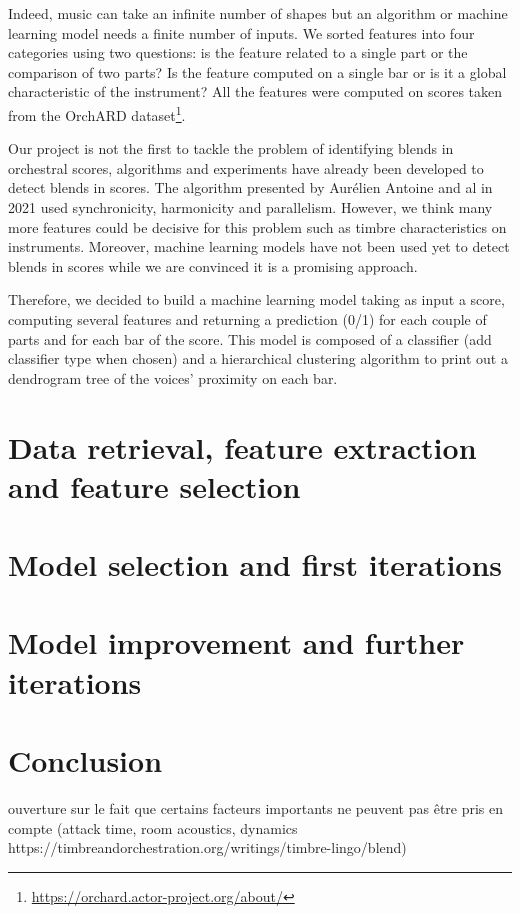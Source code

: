 \documentclass[11pt, a4paper]{article}
\begin{document}
Indeed, music can take an infinite number of shapes but an algorithm or machine learning model needs a finite number of inputs\cite{}.
We sorted features into four categories using two questions: is the feature related to a single part or the comparison of two parts?
Is the feature computed on a single bar or is it a global characteristic of the instrument?
All the features were computed on scores taken from the OrchARD dataset\footnote[1]{\url{https://orchard.actor-project.org/about/}}.


Our project is not the first to tackle the problem of identifying blends in orchestral scores, algorithms and experiments have already been developed to detect blends in scores.
The algorithm presented by Aurélien Antoine and al in 2021 used synchronicity, harmonicity and parallelism\cite{}.
However, we think many more features could be decisive for this problem such as timbre characteristics on instruments\cite{}.
Moreover, machine learning models have not been used yet to detect blends in scores while we are convinced it is a promising approach.

Therefore, we decided to build a machine learning model taking as input a score, computing several features and returning a prediction (0/1) for each couple of parts and for each bar of the score.
This model is composed of a classifier (add classifier type when chosen) and a hierarchical clustering algorithm to print out a dendrogram tree of the voices' proximity on each bar.

\newpage

\tableofcontents

\newpage

\section{Data retrieval, feature extraction and feature selection}

\section{Model selection and first iterations}

\section{Model improvement and further iterations}

\section{Conclusion}

ouverture sur le fait que certains facteurs importants ne peuvent pas être pris en compte (attack time, room acoustics, dynamics https://timbreandorchestration.org/writings/timbre-lingo/blend)

\newpage

\printbibliography%
\end{document}
